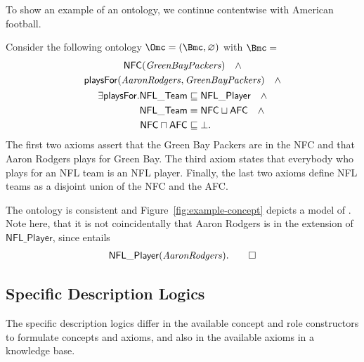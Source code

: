 To show an example of an ontology, we continue contentwise with American football.

\begin{example}\label{ex:bkb-nfl}
  Consider the following ontology $\Omc = (\Bmc,\emptyset)$ with $\Bmc =$
  \begin{gather*}
    \mathsf{NFC}(\text{\textit{GreenBayPackers}}) \quad\land\\
    \mathsf{playsFor}(\text{\textit{AaronRodgers}}, \text{\textit{GreenBayPackers}})\quad\land\\
    \begin{aligned}
      \exists\mathsf{playsFor}.\mathsf{NFL\_Team} & \sqsubseteq \mathsf{NFL\_Player}\quad\land\\
      \mathsf{NFL\_Team} & \equiv \mathsf{NFC} \sqcup \mathsf{AFC}\quad\land\\
      \mathsf{NFC} \sqcap \mathsf{AFC} & \sqsubseteq \bot.
    \end{aligned}
  \end{gather*}
  The first two axioms assert that the Green Bay Packers are in the NFC and that Aaron Rodgers plays
  for Green Bay. The third axiom states that everybody who plays for an NFL team is an NFL
  player. Finally, the last two axioms define NFL teams as a disjoint union of the NFC and the AFC.

  The ontology \Omc is consistent and Figure~\ref{fig:example-concept} depicts a model of \Omc. Note
  here, that it is not coincidentally that Aaron Rodgers is in the extension of
  $\mathsf{NFL\_Player}$, since \Omc entails
  \begin{gather*}
    \mathsf{NFL\_Player}(\text{\textit{AaronRodgers}}). \qedhere
  \end{gather*}
\end{example}

\subsection{Specific Description Logics}
\label{sec:specific-description-logics}

The specific description logics differ in the available concept and role constructors to formulate
concepts and axioms, and also in the available axioms in a knowledge base.

